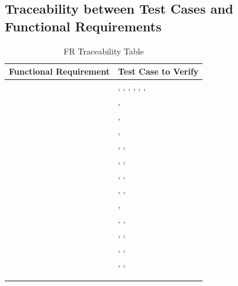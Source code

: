 \documentclass[12pt, titlepage]{article}
\begin{document}
\subsection{Traceability between Test Cases and Functional Requirements}
\begin{table}[!h]
\begin{center}
\caption {FR Traceability Table}
\label{tab:FR_Trace}
\begin{tabular}{ | m{8cm} | m{8cm} | } 
\hline
Functional Requirement & Test Case to Verify \\
\hline
\nameref{GEN_001} & \nameref{tab:STC_001}, \nameref{tab:STC_011}, \nameref{tab:STC_012}, \nameref{tab:STC_013}, \nameref{tab:STC_014}, \nameref{tab:STC_015}, \nameref{tab:STC_016} \\ \hline
\nameref{GEN_002} & \nameref{tab:STC_015}, \nameref{tab:ST16} \\ \hline
\nameref{GEN_003} & \nameref{tab:STC_001}, \nameref{tab:STC_002} \\ \hline
\nameref{GEN_004} & \nameref{tab:STC_001}, \nameref{tab:STC_002} \\ \hline
\nameref{GEN_005} & \nameref{tab:STC_013}, \nameref{tab:STC_016}, \nameref{tab:STC_015} \\ \hline
\nameref{GEN_006} & \nameref{tab:STC_013}, \nameref{tab:STC_016}, \nameref{tab:STC_015} \\ \hline
\nameref{STA_000} & \nameref{tab:STC_001}, \nameref{tab:STC_002}, \nameref{tab:STC_003} \\ \hline
\nameref{STA_001} & \nameref{tab:STC_001}, \nameref{tab:STC_002}, \nameref{tab:STC_003} \\ \hline
\nameref{STA_002} & \nameref{tab:STC_005}, \nameref{tab:STC_011} \\ \hline
\nameref{STA_003} & \nameref{tab:STC_016}, \nameref{tab:STC_012}, \nameref{tab:STC_013} \\ \hline
\nameref{STA_004} & \nameref{tab:STC_001}, \nameref{tab:STC_002}, \nameref{tab:STC_003} \\ \hline
\nameref{STA_005} & \nameref{tab:STC_001}, \nameref{tab:STC_002}, \nameref{tab:STC_003} \\ \hline
\nameref{STA_006} & \nameref{tab:STC_001}, \nameref{tab:STC_002}, \nameref{tab:STC_003} \\ \hline
\nameref{STA_007} & \nameref{tab:STC_011} \\ \hline
\nameref{STA_008} & \nameref{tab:STC_012} \\ \hline
\nameref{STA_009} & \nameref{tab:STC_006} \\ \hline

\end{tabular}
\end{center}
\end{table}
\end{document}
